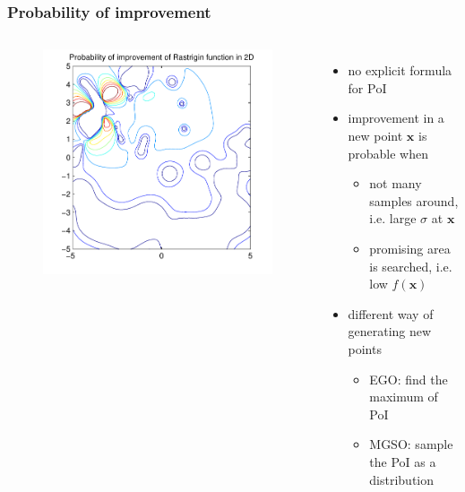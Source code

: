 \documentclass[sans,mathserif]{beamer}
\newcommand{\xx}{\mathrm{\mathbf{x}}}
\newcommand{\blue}[1]{{\color{blue} #1}}
\begin{document}
\begin{frame}
  \frametitle{Probability of improvement}
  \begin{columns}[T]
  \column{5cm}
    \begin{figure}
    \includegraphics[width=\linewidth]{img/poi-example-color}
    \end{figure}
  \column{5.5cm}
    \begin{itemize}
      \item no explicit formula for $\mathrm{PoI}$
      \item improvement in a new point $\xx$ is probable when
        \begin{itemize}
          \item not many samples around, i.e. large $\sigma$ at $\xx$
          \item promising area is searched, i.e. low $f(\xx)$
        \end{itemize}
      \pause
      \item different way of generating new points
        \begin{itemize}
          \item \blue{EGO}: find the maximum of PoI
          \item \blue{MGSO}: sample the PoI as a distribution
        \end{itemize}
    \end{itemize}
  \end{columns}
\end{frame}
\end{document}
